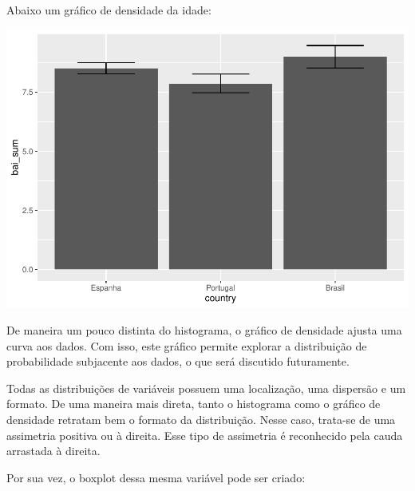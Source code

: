 \documentclass[
]{book}
\newenvironment{Shaded}{\begin{snugshade}}{\end{snugshade}}
\newcommand{\DataTypeTok}[1]{\textcolor[rgb]{0.13,0.29,0.53}{#1}}
\newcommand{\KeywordTok}[1]{\textcolor[rgb]{0.13,0.29,0.53}{\textbf{#1}}}
\newcommand{\NormalTok}[1]{#1}
\newcommand{\OperatorTok}[1]{\textcolor[rgb]{0.81,0.36,0.00}{\textbf{#1}}}
\newcommand{\StringTok}[1]{\textcolor[rgb]{0.31,0.60,0.02}{#1}}
\begin{document}
Abaixo um gráfico de densidade da idade:

\begin{Shaded}
\end{Shaded}

\begin{center}\includegraphics{gitbook-demo_files/figure-latex/unnamed-chunk-20-1} \end{center}

De maneira um pouco distinta do histograma, o gráfico de densidade ajusta uma curva aos dados. Com isso, este gráfico permite explorar a distribuição de probabilidade subjacente aos dados, o que será discutido futuramente.

Todas as distribuições de variáveis possuem uma localização, uma dispersão e um formato. De uma maneira mais direta, tanto o histograma como o gráfico de densidade retratam bem o formato da distribuição. Nesse caso, trata-se de uma assimetria positiva ou à direita. Esse tipo de assimetria é reconhecido pela cauda arrastada à direita.

Por sua vez, o boxplot dessa mesma variável pode ser criado:

\begin{Shaded}
\end{Shaded}
\end{document}
